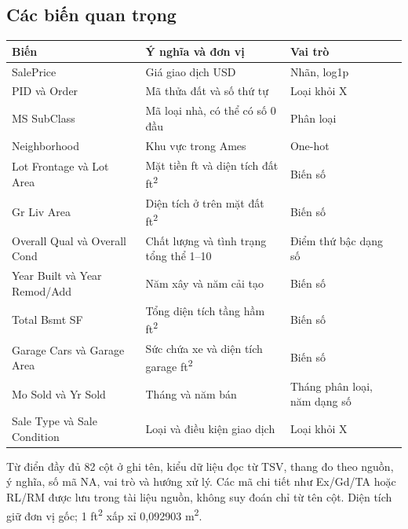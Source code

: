 \documentclass[12pt,a4paper]{article}
\begin{document}
\subsection{Các biến quan trọng}

\begingroup\small\setlength{\tabcolsep}{5pt}
\begin{tabularx}{\linewidth}{@{}YYY@{}}\toprule

\textbf{Biến} & \textbf{Ý nghĩa và đơn vị} & \textbf{Vai trò}\\

\midrule

SalePrice & Giá giao dịch USD & Nhãn, log1p\\

PID và Order & Mã thửa đất và số thứ tự & Loại khỏi X\\

MS SubClass & Mã loại nhà, có thể có số 0 đầu & Phân loại\\

Neighborhood & Khu vực trong Ames & One-hot\\

Lot Frontage và Lot Area & Mặt tiền ft và diện tích đất ft\textsuperscript{2} & Biến số\\

Gr Liv Area & Diện tích ở trên mặt đất ft\textsuperscript{2} & Biến số\\

Overall Qual và Overall Cond & Chất lượng và tình trạng tổng thể 1–10 & Điểm thứ bậc dạng số\\

Year Built và Year Remod/Add & Năm xây và năm cải tạo & Biến số\\

Total Bsmt SF & Tổng diện tích tầng hầm ft\textsuperscript{2} & Biến số\\

Garage Cars và Garage Area & Sức chứa xe và diện tích garage ft\textsuperscript{2} & Biến số\\

Mo Sold và Yr Sold & Tháng và năm bán & Tháng phân loại, năm dạng số\\

Sale Type và Sale Condition & Loại và điều kiện giao dịch & Loại khỏi X\\

\bottomrule\end{tabularx}\endgroup\par

Từ điển đầy đủ 82 cột ở  ghi tên, kiểu dữ liệu đọc từ TSV, thang đo theo nguồn, ý nghĩa, số mã NA, vai trò và hướng xử lý. Các mã chi tiết như Ex/Gd/TA hoặc RL/RM được lưu trong tài liệu nguồn, không suy đoán chỉ từ tên cột. Diện tích giữ đơn vị gốc; 1 ft\textsuperscript{2} xấp xỉ 0,092903 m\textsuperscript{2}.
\end{document}
